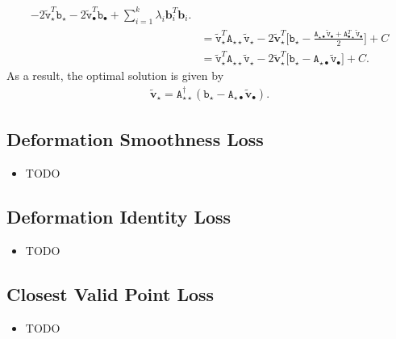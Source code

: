 \documentclass[10pt]{article}
\newcommand{\ve}[1]{\mathbf{#1}}
\newcommand{\mtt}[1]{\mathtt{#1}}
\begin{document}
\begin{itemize}
\begin{align*}
        -2 \widetilde{\mtt{v}}_{\star}^T \mtt{b}_{\star} -2 \widetilde{\mtt{v}}_{\bullet}^T \mtt{b}_{\bullet} + \sum_{i=1}^k \lambda_i \ve{b}_i^T \ve{b}_i. \\
        &= \widetilde{\mtt{v}}_{\star}^T \mtt{A}_{\star \star} \widetilde{\mtt{v}}_{\star} 
        - 2\widetilde{\ve{v}}_{\star}^T \bigg[ 
             \mtt{b}_{\star} - \frac{\mtt{A}_{\star\bullet} \widetilde{\mtt{v}}_{\bullet} + \mtt{A}_{\bullet\star}^T \widetilde{\mtt{v}}_{\bullet} }{2}
        \bigg] + C \\
        &= \widetilde{\mtt{v}}_{\star}^T \mtt{A}_{\star \star} \widetilde{\mtt{v}}_{\star} 
        - 2\widetilde{\ve{v}}_{\star}^T \big[ 
             \mtt{b}_{\star} - \mtt{A}_{\star\bullet} \widetilde{\mtt{v}}_{\bullet}
        \bigg] + C.
    \end{align*}
    As a result, the optimal solution is given by
    \begin{align*}
        \widetilde{\ve{v}}_{\star} = \mtt{A}_{\star \star} ^{\dagger} \left( \mtt{b}_{\star} - \mtt{A}_{\star\bullet} \widetilde{\ve{v}}_{\bullet} \right).
    \end{align*}
\end{itemize}

\subsection{Deformation Smoothness Loss}

\begin{itemize}
    \item TODO
\end{itemize}

\subsection{Deformation Identity Loss}

\begin{itemize}
    \item TODO
\end{itemize}

\subsection{Closest Valid Point Loss}

\begin{itemize}
    \item TODO
\end{itemize}


  
\end{document}
